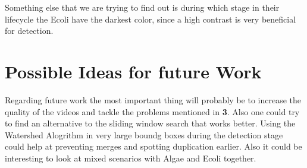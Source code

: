 \documentclass{article}
\begin{document}
Something else that we are trying to find out is during which stage in their lifecycle the Ecoli have the darkest color,
since a high contrast is very beneficial for detection. 
\section{Possible Ideas for future Work}
Regarding future work the most important thing will probably be to increase the quality of the videos and tackle the problems
mentioned in \textbf{3}. Also one could try to find an alternative to the sliding window search that works better. Using the Watershed
Alogrithm in very large boundg boxes during the detection stage could help at preventing merges and spotting duplication earlier.
Also it could be interesting to look at mixed scenarios with Algae and Ecoli together.
\end{document}
